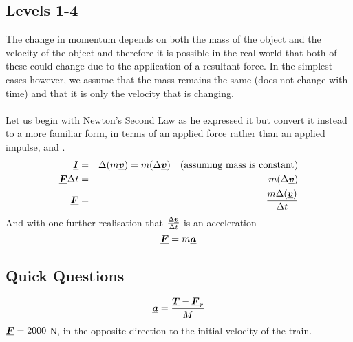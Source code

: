 \subsection*{Levels 1-4}
The change in momentum depends on both the mass of the object and the velocity of the object and therefore it is possible in the real world that both of these could change due to the application of a resultant force. In the simplest cases however, we assume that the mass remains the same (does not change with time) and that it is only the velocity that is changing.
\\
\\
Let us begin with Newton's Second Law as he expressed it but convert it instead to a more familiar form, in terms of an applied force rather than an applied impulse, and .
\begin{eqnarray}
{\vtr I}&=&\Delta({m {\vtr v}}) =m(\Delta{\vtr v})\ \ \ (\mbox{assuming mass is constant})\nonumber\\
{\vtr F}\Delta t&=&m(\Delta{\vtr v}) \nonumber \\
{\vtr F}&=&\frac{m\Delta({\vtr v})}{\Delta t} \label{eqn:NIIF}
\end{eqnarray}
And with one further realisation that $\frac{\Delta {\mathit{\underline{\boldsymbol{v}}}}}{\Delta t}$  is an acceleration
\begin{equation}
{\mathit{\underline{\boldsymbol{F}}}}=m {\mathit{\underline{\boldsymbol{a}}}}
\end{equation}

\subsection*{Quick Questions}
\nl
{}  {
\begin{equation}
{\mathit{\underline{\boldsymbol{a}}}}=\frac{{\mathit{\underline{\boldsymbol{T}}}}-{\mathit{\underline{\boldsymbol{F}}}_r}}{M}\nonumber
\end{equation}}
 {${\mathit{\underline{\boldsymbol{F}}}}={2000}$ {N}, in the opposite direction to the initial velocity of the train.}


